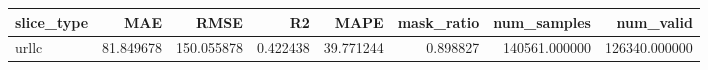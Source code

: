 \begin{tabular}{lrrrrrrr}
\toprule
slice_type & MAE & RMSE & R2 & MAPE & mask_ratio & num_samples & num_valid \\
\midrule
urllc & 81.849678 & 150.055878 & 0.422438 & 39.771244 & 0.898827 & 140561.000000 & 126340.000000 \\
\bottomrule
\end{tabular}
